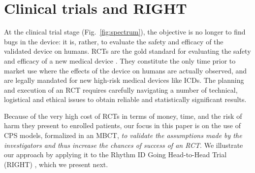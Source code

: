 \section{Clinical trials and RIGHT}
\label{sec:rcts}

At the clinical trial stage (Fig.~\ref{fig:spectrum}), the objective is no longer to find bugs in the device: it is, rather, to evaluate the safety and efficacy of the validated device on humans. 
\acp{RCT} are the gold standard for evaluating the safety and efficacy of a new medical device \cite{FriedmanFD10_ClinicalTrials}.
They constitute the only time prior to market use where the effects of the device on humans are actually observed, and are legally mandated for new high-risk medical devices like \acp{ICD}.
The planning and execution of an \ac{RCT} requires carefully navigating a number of technical, logistical and ethical issues to obtain reliable and statistically significant results.

Because of the very high cost of \acp{RCT} in terms of money, time, and the risk of harm they present to enrolled patients, our focus in this paper is on the use of CPS models, formalized in an \ac{MBCT}, \emph{to validate the assumptions made by the investigators and thus increase the chances of success of an \ac{RCT}}.
We illustrate our approach by applying it to the Rhythm ID Going Head-to-Head Trial (RIGHT) \cite{GoldABBTB11_RIGHTresults}, which we present next.
